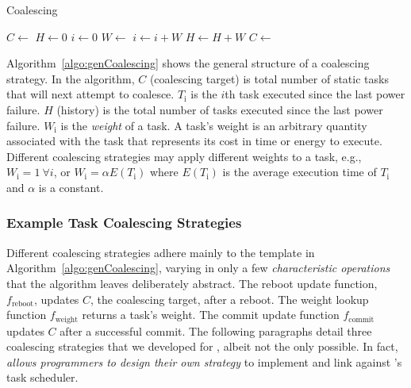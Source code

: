 \begin{algorithm}[t]
	\caption{Coalescing}
	\label{algo:genCoalescing}
	\scriptsize
	\begin{algorithmic}[1]
        \State $C \leftarrow $  
        \State $H \gets 0$ 
	        \State $ i \gets 0$
		        \State {}
		        \State $W \leftarrow $  
		        \State $i \gets i + W$
				\State $H \gets H + W$
	        \EndWhile
	        \State {}
                \State $C \leftarrow $  
        \EndWhile
	\end{algorithmic}
\end{algorithm}

Algorithm~\ref{algo:genCoalescing} shows the general structure of a coalescing strategy. In the algorithm, $C$ (coalescing target) is total number of static tasks that \sys will next attempt to coalesce. $T_\text{i}$ is the $i$th task executed since the last power failure. $H$ (history) is the total number of tasks executed since the last power failure. $W_\text{i}$ is the {\em weight} of a task. A task's weight is an arbitrary quantity associated with the task that represents its cost in time or energy to execute. Different coalescing strategies may apply different weights to a task, e.g., $W_\text{i} = 1\ \forall i$, or $W_\text{i} = \alpha E(T_\text{i})$ where $E(T_\text{i})$ is the average execution time of $T_\text{i}$ and $\alpha$ is a constant.

\subsubsection{Example Task Coalescing Strategies}
\label{subsec:coalescingStrategies}

Different coalescing strategies adhere mainly to the template in Algorithm~\ref{algo:genCoalescing}, varying in only a few {\em characteristic operations} that the algorithm leaves deliberately abstract. The reboot update function, $f_\text{reboot}$, updates $C$, the coalescing target, after a reboot. The weight lookup function $f_\text{weight}$ returns a task's weight. The commit update function $f_\text{commit}$ updates $C$ after a successful commit. The following paragraphs detail three coalescing strategies that we developed for \sys, albeit not the only possible. In fact, \sys \emph{allows programmers to design their own strategy} to implement and link against \sys's task scheduler. 

